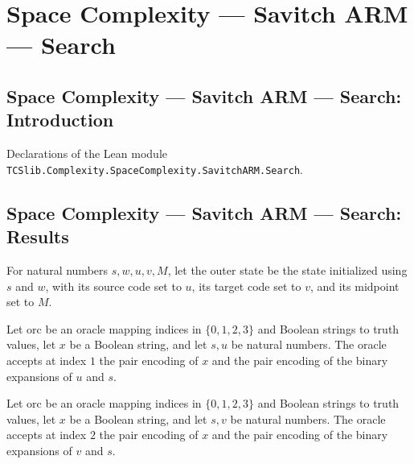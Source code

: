 \section{Space Complexity --- Savitch ARM --- Search}
\subsection*{Space Complexity --- Savitch ARM --- Search: Introduction}

Declarations of the Lean module \texttt{TCSlib.Complexity.SpaceComplexity.SavitchARM.Search}.

\subsection*{Space Complexity --- Savitch ARM --- Search: Results}

\begin{definition}
\label{Complexity.LogProg.SavitchARM.outerSt}
\leanok
{}
For natural numbers $s,w,u,v,M$, let the outer state be the state initialized using $s$
and $w$, with its source code set to $u$, its target code set to $v$, and its midpoint
set to $M$.
\end{definition}

\begin{definition}
\label{Complexity.LogProg.SavitchARM.InitO}
\leanok
{}
Let $\mathrm{orc}$ be an oracle mapping indices in $\{0,1,2,3\}$ and Boolean strings to
truth values, let $x$ be a Boolean string, and let $s,u$ be natural numbers. The oracle
accepts at index $1$ the pair encoding of $x$ and the pair encoding of the binary
expansions of $u$ and $s$.
\end{definition}

\begin{definition}
\label{Complexity.LogProg.SavitchARM.AccO}
\leanok
{}
Let $\mathrm{orc}$ be an oracle mapping indices in $\{0,1,2,3\}$ and Boolean strings to
truth values, let $x$ be a Boolean string, and let $s,v$ be natural numbers. The oracle
accepts at index $2$ the pair encoding of $x$ and the pair encoding of the binary
expansions of $v$ and $s$.
\end{definition}

